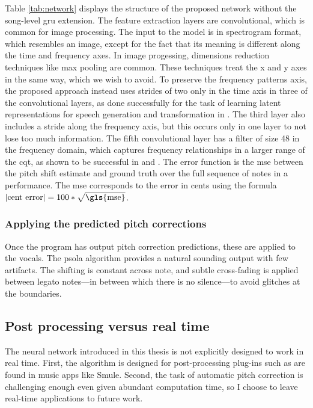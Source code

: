 Table \ref{tab:network} displays the structure of the proposed network without the song-level \gls{gru} extension. The feature extraction layers are convolutional, which is common for image processing. The input to the model is in spectrogram format, which resembles an image, except for the fact that its meaning is different along the time and frequency axes. In image progessing, dimensions reduction techniques like max pooling are common. These techniques treat the x and y axes in the same way, which we wish to avoid. To preserve the frequency patterns axis, the proposed approach instead uses strides of two only in the time axis in three of the convolutional layers, as done successfully for the task of learning latent representations for speech generation and transformation in \cite{hsu2017learning}. The third layer also includes a stride along the frequency axis, but this occurs only in one layer to not lose too much information. The fifth convolutional layer has a filter of size 48 in the frequency domain, which captures frequency relationships in a larger range of the \gls{cqt}, as shown to be successful in \cite{bittner2017deep} and \cite{hsu2017learning}. 
The error function is the \gls{mse} between the pitch shift estimate and ground truth over the full sequence of notes in a performance. The \gls{mse} corresponds to the error in cents using the formula $\left|\text{cent error}\right| = 100 * \sqrt{\text{\gls{mse}}}$. %

\subsubsection{Applying the predicted pitch corrections}
Once the program has output pitch correction predictions, these are applied to the vocals. The \gls{psola} algorithm provides a natural sounding output with few artifacts. The shifting is constant across note, and subtle cross-fading is applied between legato notes---in between which there is no silence---to avoid glitches at the boundaries.

\subsection{Post processing versus real time}
The neural network introduced in this thesis is not explicitly designed to work in real time. First, the algorithm is designed for post-processing plug-ins such as are found in music apps like Smule. Second, the task of automatic pitch correction is challenging enough even given abundant computation time, so I choose to leave real-time applications to future work. 

